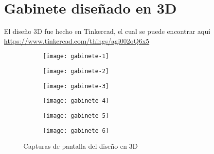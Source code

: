 \documentclass[../informe_krapp.tex]{subfiles}
\begin{document}
\section{Gabinete diseñado en 3D}
El diseño 3D fue hecho en Tinkercad, el cual se puede encontrar aquí \small{\url{ https://www.tinkercad.com/things/agi002oQ6x5 }}

\begin{figure}[H]
	\centering
	\begin{subfigure}[b]{0.49\textwidth}
		\centering
		\texttt{[image: gabinete-1]}
	\end{subfigure}
	\hfill
	\begin{subfigure}[b]{0.49\textwidth}
		\centering
		\texttt{[image: gabinete-2]}
	\end{subfigure}

	\begin{subfigure}[b]{0.49\textwidth}
		\centering
		\texttt{[image: gabinete-3]}
	\end{subfigure}
	\hfill
	\begin{subfigure}[b]{0.49\textwidth}
		\centering
		\texttt{[image: gabinete-4]}
	\end{subfigure}

	\begin{subfigure}[b]{0.49\textwidth}
		\centering
		\texttt{[image: gabinete-5]}
	\end{subfigure}
	\hfill
	\begin{subfigure}[b]{0.49\textwidth}
		\centering
		\texttt{[image: gabinete-6]}
	\end{subfigure}
	\caption{Capturas de pantalla del diseño en 3D}
\end{figure}
\end{document}
